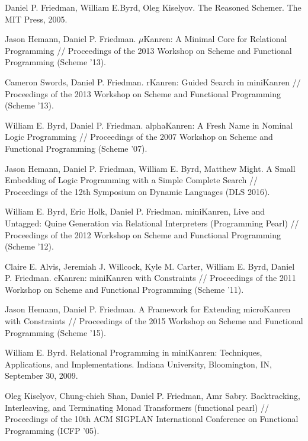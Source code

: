 \documentclass[preprint,numbers,10pt]{sigplanconf}
\begin{document}
\begin{thebibliography}{99}
Daniel P. Friedman, William E.Byrd, Oleg Kiselyov. The Reasoned Schemer. The MIT
Press, 2005.

Jason Hemann, Daniel P. Friedman. $\mu$Kanren: A Minimal Core for Relational Programming //
Proceedings of the 2013 Workshop on Scheme and Functional Programming (Scheme '13).

Cameron Swords, Daniel P. Friedman. rKanren: Guided Search in miniKanren //
Proceedings of the 2013 Workshop on Scheme and Functional Programming (Scheme '13). 

William E. Byrd, Daniel P. Friedman. alphaKanren: A Fresh Name in Nominal Logic Programming //
Proceedings of the 2007 Workshop on Scheme and Functional Programming (Scheme '07).

Jason Hemann, Daniel P. Friedman, William E. Byrd, Matthew Might.
A Small Embedding of Logic Programming with a Simple Complete Search //
Proceedings of the 12th Symposium on Dynamic Languages (DLS 2016).

William E. Byrd, Eric Holk, Daniel P. Friedman.
miniKanren, Live and Untagged: Quine Generation via Relational Interpreters (Programming Pearl) //
Proceedings of the 2012 Workshop on Scheme and Functional Programming (Scheme '12).

Claire E. Alvis, Jeremiah J. Willcock, Kyle M. Carter, William E. Byrd, Daniel P. Friedman.
cKanren: miniKanren with Constraints // 
Proceedings of the 2011 Workshop on Scheme and Functional Programming (Scheme '11).

Jason Hemann, Daniel P. Friedman. A Framework for Extending microKanren with Constraints //
Proceedings of the 2015 Workshop on Scheme and Functional Programming (Scheme '15).

William E. Byrd. Relational Programming in miniKanren: Techniques, Applications, and Implementations.
Indiana University, Bloomington, IN, September 30, 2009.


Oleg Kiselyov, Chung-chieh Shan, Daniel P. Friedman, Amr Sabry. Backtracking, Interleaving, and Terminating Monad Transformers (functional pearl) //
Proceedings of the 10th ACM SIGPLAN International Conference on Functional Programming (ICFP '05).


\end{thebibliography}
\end{document}
